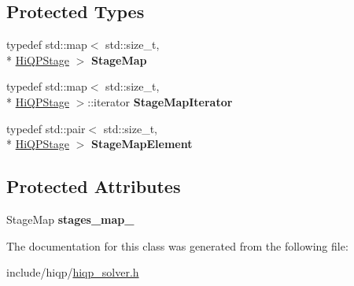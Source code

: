 \subsection*{Protected Types}
\begin{DoxyCompactItemize}
\item 
\hypertarget{classhiqp_1_1HiQPSolver_afc1077bf48c2ad65aae0140f0aa296f7}{typedef std\-::map$<$ std\-::size\-\_\-t, \\*
\hyperlink{structhiqp_1_1HiQPStage}{Hi\-Q\-P\-Stage} $>$ {\bfseries Stage\-Map}}\label{classhiqp_1_1HiQPSolver_afc1077bf48c2ad65aae0140f0aa296f7}

\item 
\hypertarget{classhiqp_1_1HiQPSolver_a2766a24ebd93fb0ebcc6a5e655b6dd03}{typedef std\-::map$<$ std\-::size\-\_\-t, \\*
\hyperlink{structhiqp_1_1HiQPStage}{Hi\-Q\-P\-Stage} $>$\-::iterator {\bfseries Stage\-Map\-Iterator}}\label{classhiqp_1_1HiQPSolver_a2766a24ebd93fb0ebcc6a5e655b6dd03}

\item 
\hypertarget{classhiqp_1_1HiQPSolver_aff93ec714f04fc68e3279376e66e1821}{typedef std\-::pair$<$ std\-::size\-\_\-t, \\*
\hyperlink{structhiqp_1_1HiQPStage}{Hi\-Q\-P\-Stage} $>$ {\bfseries Stage\-Map\-Element}}\label{classhiqp_1_1HiQPSolver_aff93ec714f04fc68e3279376e66e1821}

\end{DoxyCompactItemize}
\subsection*{Protected Attributes}
\begin{DoxyCompactItemize}
\item 
\hypertarget{classhiqp_1_1HiQPSolver_ace60cd0962fae7c46a88e68047f2cc29}{Stage\-Map {\bfseries stages\-\_\-map\-\_\-}}\label{classhiqp_1_1HiQPSolver_ace60cd0962fae7c46a88e68047f2cc29}

\end{DoxyCompactItemize}


The documentation for this class was generated from the following file\-:\begin{DoxyCompactItemize}
\item 
include/hiqp/\hyperlink{hiqp__solver_8h}{hiqp\-\_\-solver.\-h}\end{DoxyCompactItemize}
